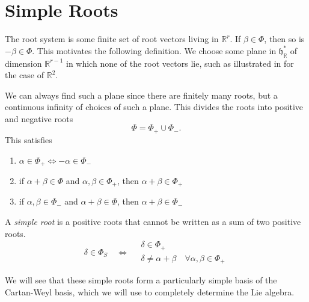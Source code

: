 \section{Simple Roots}%
\label{sec:simple_roots}


The root system is some finite set of root vectors living in $\mathbb{R}^r$. If $\beta \in \Phi$, then so is  $-\beta \in \Phi$.
This motivates the following definition. 
We choose some plane in $\mathfrak{h}^*_{\mathbb{R}}$ of dimension  $\mathbb{R}^{r-1}$ in which none of the root vectors lie, such as illustrated in %
for the case of $\mathbb{R}^2$.

We can always find such a plane since there are finitely many roots, but a continuous infinity of choices of such a plane.
This divides the roots into positive and negative roots
\begin{equation}
  \Phi = \Phi_+ \cup \Phi_-.
\end{equation}
This satisfies
\begin{enumerate}
  \item $\alpha \in \Phi_+ \iff -\alpha \in \Phi_-$
  \item if $\alpha + \beta \in \Phi$ and $\alpha, \beta \in \Phi_+$, then $\alpha + \beta \in \Phi_+$
  \item if $\alpha, \beta \in \Phi_-$ and $\alpha + \beta \in \Phi$, then $\alpha + \beta \in \Phi_-$
\end{enumerate}
\begin{definition}[]
  A \emph{simple root} is a positive roots that cannot be written as a sum of two positive roots.
  \begin{equation}
    \delta \in \Phi_S \quad \iff \quad
    \begin{gathered}
      \delta \in \Phi_+ \\
      \delta \neq \alpha + \beta \quad \forall \alpha, \beta \in \Phi_+
    \end{gathered}
  \end{equation}
\end{definition}
We will see that these simple roots form a particularly simple basis of the Cartan-Weyl basis, which we will use to completely determine the Lie algebra.
